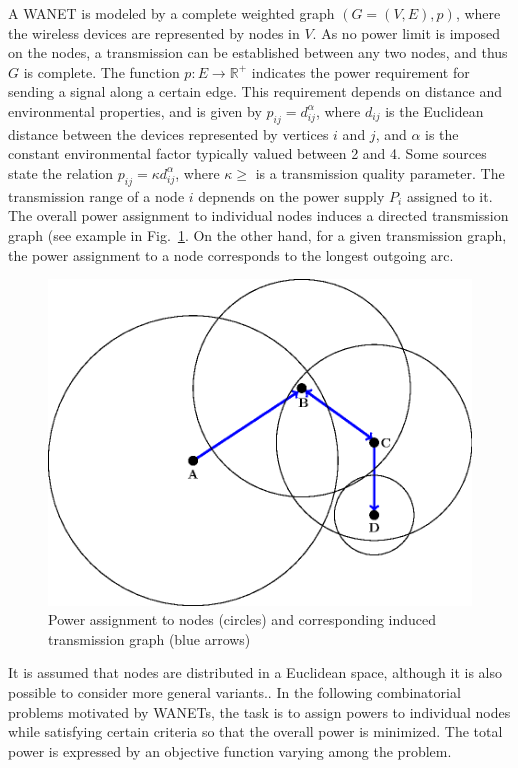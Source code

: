 A WANET is modeled by a complete weighted graph $(G=(V,E),p)$, where the wireless devices are represented by nodes in $V$. 
As no power limit is imposed on the nodes, a transmission can be established between any two nodes, and thus $G$ is complete.
The function $p:E\to \mathbb{R}^+$ indicates the power requirement for sending a signal along a certain edge.
This requirement depends on distance and environmental properties, and is given by  $p_{ij}=d_{ij}^\alpha$, 
where $d_{ij}$ is the Euclidean distance between the devices represented by vertices $i$ and $j$, and $\alpha$ is the constant environmental factor typically valued between 2 and 4. 
Some sources state the relation $p_{ij}=\kappa d_{ij}^\alpha$, where $\kappa\geq$ is a transmission quality parameter.
The transmission range of a node $i$ depnends on the power supply $P_i$ assigned to it.
The overall power assignment to individual nodes induces a directed transmission graph (see example in Fig.~\ref{fig:transgraph}. 
On the other hand, for a given transmission graph, the power assignment to a node corresponds to the longest outgoing arc.
\begin{figure}[htb!]
  \centering
  \includegraphics[scale=.8]{figurer/tran-graph.eps}
  \caption{Power assignment to nodes (circles)  and corresponding induced transmission graph (blue arrows)}
  \label{fig:transgraph}
\end{figure}
It is assumed that nodes are distributed in a Euclidean space, although it is also possible to consider more general variants..
In the following combinatorial problems motivated by WANETs, the task is to assign powers to individual nodes while satisfying certain criteria so that the overall power is minimized.
The total power is expressed by an objective function varying among the problem.

